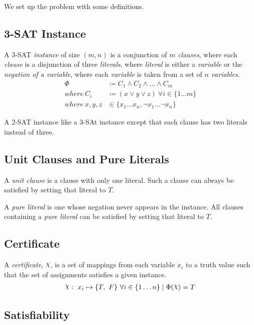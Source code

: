 We set up the problem with some definitions.


\subsection{3-SAT Instance}
\label{subsec:3-sat-instance}

A 3-SAT \textit{instance} of size $(m, n)$ is a conjunction of $m$ \textit{clauses}, where each \textit{clause} is a disjunction of three \textit{literals}, where \textit{literal} is either a \textit{variable} or the \textit{negation of a variable}, where each \textit{variable} is taken from a set of $n$ \textit{variables}.
\begin{align*}
    \Phi & \coloneqq C_1 \land C_2 \land \ldots \land C_m \\
    where~ C_i & \coloneqq (x \lor y \lor z)~ \forall i \in \{ 1 \ldots m \} \\
    where~ x, y, z & \in \{ x_1 \ldots x_n, \lnot x_1 \ldots \lnot x_n \}
\end{align*}

A 2-SAT instance like a 3-SAt instance except that each clause has two literals instead of three.


\subsection{Unit Clauses and Pure Literals}
\label{subsec:unit-clauses-and-pure-literals}

A \textit{unit clause} is a clause with only one literal.
Such a clause can always be satisfied by setting that literal to $T$.

A \textit{pure literal} is one whose negation never appears in the instance.
All clauses containing a \textit{pure literal} can be satisfied by setting that literal to $T$.


\subsection{Certificate}
\label{subsec:certificate}

A \textit{certificate}, $\rchi$, is a set of mappings from each variable $x_i$ to a truth value such that the set of assignments satisfies a given instance.
\begin{align*}
    \rchi :~ x_i \mapsto \{ T,~ F \}~ \forall i \in \{ 1 \ldots n \}
    \mid \Phi(\rchi) = T
\end{align*}


\subsection{Satisfiability}
\label{subsec:satisfiability}

